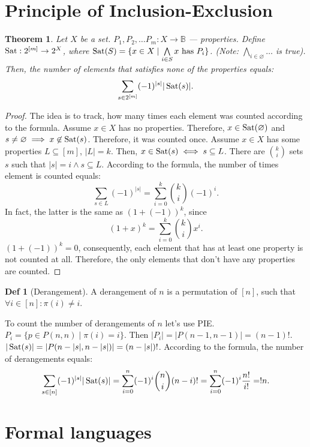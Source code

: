 \documentclass[a4paper]{article}
\newtheorem{theorem}{Theorem}[section]
\theoremstyle{definition}
\newtheorem{definition}{Def}
\begin{document}
\section{Principle of Inclusion-Exclusion}
\begin{theorem}
  Let \(X\) be a set.
  \(P_1, P_2, \ldots P_m : X \to \mathbb{B}\) --- properties.
  Define \(\operatorname{Sat} : 2^{[m]} \to 2^X\), where
  \(\operatorname{Sat}(S) = \{ x \in X \mid \bigwedge\limits_{i \in S} x\ \text{has}\ P_i\}\).
  (Note: \(\bigwedge\limits_{i \in \varnothing} \ldots\) is true).
  Then, the number of elements that satisfies none of the properties equals:
  \[
    \sum_{s \in 2^{[m]}} (-1)^{|s|} |\operatorname{Sat}(s)|
  .\]
\end{theorem}
\begin{proof}
  The idea is to track, how many times each element was counted according to
  the formula.
  Assume \(x \in X\) has no properties. Therefore, \(x \in \operatorname{Sat}(\varnothing)\)
  and \(s \neq \varnothing \implies x \not\in \operatorname{Sat}(s)\).
  Therefore, it was counted once.
  Assume \(x \in X\) has some properties \(L \subseteq [m]\), \(|L| = k\).
  Then, \(x \in \operatorname{Sat}(s) \iff s \subseteq L\).
  There are
  \(\binom{k}{i}\) sets \(s\) such that \(|s| = i \land s \subseteq L\).
  According to the formula, the number of times element is counted equals:
  \[
    \sum_{s \in L} (-1)^{|s|}
    = \sum_{i = 0}^{k} \binom{k}{i} (-1)^{i}
  .\]
  In fact, the latter is the same as \((1 + (-1))^k\), since
   \[
    (1 + x)^{k} = \sum_{i = 0}^{k} \binom{k}{i} x^{i}
  .\]
  \((1 + (-1))^k = 0\), consequently, each element that has at least
  one property is not counted at all.
  Therefore, the only elements that don't have any properties are counted.
\end{proof}

\begin{definition}[Derangement]
  A derangement of \(n\) is a permutation of \([n]\), such that
  \(\forall i \in [n] : \pi(i) \neq i\).
\end{definition}

To count the number of derangements of \(n\) let's use PIE.
\(P_i = \{ p \in P(n, n) \mid \pi(i) = i\}\).
Then \(|P_i| = |P(n - 1, n - 1)| =  (n - 1)!\).
\(|\operatorname{Sat}(s)| = |P(n - |s|, n - |s|)| = (n - |s|)!\).
According to the formula, the number of derangements equals:
\[
  \sum_{s \in [n]} (-1)^{|s|} |\operatorname{Sat}(s)|
  = \sum_{i = 0}^{n} (-1)^i \binom{n}{i} (n - i)!
  = \sum_{i = 0}^{n} (-1)^i \frac{n!}{i!}
  = !n
.\]

\section{Formal languages}
\end{document}
